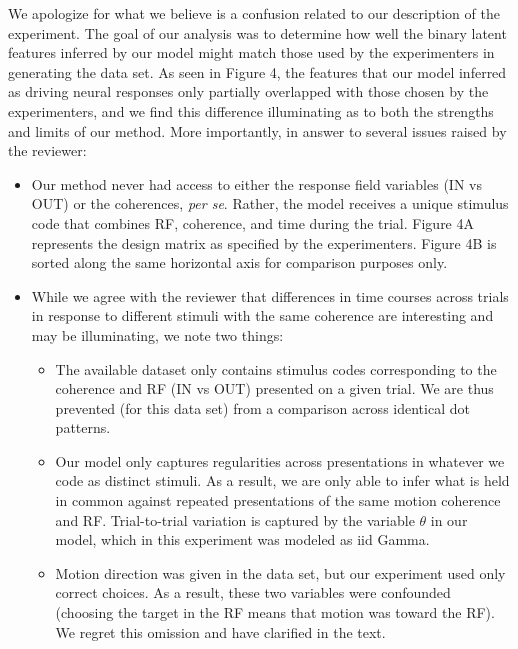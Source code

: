\documentclass[12pt,a4paper]{article}
\newcommand{\edit}[1]{\textcolor{edit}{#1}}
\begin{document}
\begin{enumerate}
\edit{
We apologize for what we believe is a confusion related to our description of the experiment. The goal of our analysis was to determine how well the binary latent features inferred by our model might match those used by the experimenters in generating the data set. As seen in Figure 4, the features that our model inferred as driving neural responses only partially overlapped with those chosen by the experimenters, and we find this difference illuminating as to both the strengths and limits of our method. More importantly, in answer to several issues raised by the reviewer:
\begin{itemize}
    \item Our method never had access to either the response field variables (IN vs OUT) or the coherences, \emph{per se}. Rather, the model receives a unique stimulus code that combines RF, coherence, and time during the trial. Figure 4A represents the design matrix as specified by the experimenters. Figure 4B is sorted along the same horizontal axis for comparison purposes only.
    \item While we agree with the reviewer that differences in time courses across trials in response to different stimuli with the same coherence are interesting and may be illuminating, we note two things:
    \begin{itemize}
        \item The available dataset only contains stimulus codes corresponding to the coherence and RF (IN vs OUT) presented on a given trial. We are thus prevented (for this data set) from a comparison across identical dot patterns.
        \item Our model only captures regularities across presentations in whatever we code as distinct stimuli. As a result, we are only able to infer what is held in common against repeated presentations of the same motion coherence and RF. Trial-to-trial variation is captured by the variable $\theta$ in our model, which in this experiment was modeled as iid Gamma.
        \item {\color{red} Motion direction was given in the data set, but our experiment used only correct choices. As a result, these two variables were confounded (choosing the target in the RF means that motion was toward the RF). We regret this omission and have clarified in the text.}
    \end{itemize}
\end{itemize}
}
\end{enumerate}
\end{document}
